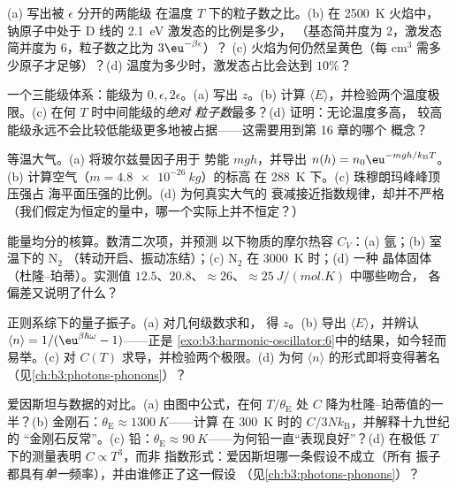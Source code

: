 \begin{exercise}[$\star$]\label{exo:b3:canonical-ensemble:1}
(a) 写出被 $\epsilon$ 分开的两能级
在温度 $T$ 下的粒子数之比。(b) 在 \qty{2500}{K} 火焰中，
钠原子中处于 D 线的 \qty{2.1}{eV} 激发态的比例是多少，
（基态简并度为 2，激发态简并度为 6，粒子数之比为
$3\eu^{-\beta\epsilon}$）？
(c) 火焰为何仍然呈黄色（每
cm$^3$ 需多少原子才足够）？(d) 温度为多少时，激发态占比会达到
$10\%$？
\end{exercise}

\begin{exercise}[$\star$]\label{exo:b3:canonical-ensemble:2}
一个三能级体系：能级为 $0, \epsilon, 2\epsilon$。(a) 写出 $z$。(b)
计算 $\langle E\rangle$，并检验两个温度极限。(c)
在何 $T$ 时中间能级的\emph{绝对
粒子数}最多？(d) 证明：无论温度多高，
较高能级永远不会比较低能级更多地被占据——这需要用到第 16 章的哪个
概念？
\end{exercise}

\begin{exercise}[$\star$]\label{exo:b3:canonical-ensemble:3}
等温大气。(a) 将玻尔兹曼因子用于
势能 $mgh$，并导出 $n(h) = n_0\eu^{-mgh/k_{\text{B}}
T}$。(b) 计算空气（$m = \qty{4.8e-26}{kg}$）的标高
在 \qty{288}{K} 下。(c) 珠穆朗玛峰峰顶压强占
海平面压强的比例。(d) 为何真实大气的
衰减接近指数规律，却并不严格（我们假定为恒定的量中，哪一个实际上并不恒定？）
\end{exercise}

\begin{exercise}[$\star$]\label{exo:b3:canonical-ensemble:4}
能量均分的核算。数清二次项，并预测
以下物质的摩尔热容 $C_V$：(a) 氩；(b) 室温下的 N$_2$
（转动开启、振动冻结）；(c) N$_2$ 在 \qty{3000}{K} 时；(d) 一种
晶体固体（杜隆–珀蒂）。实测值
$12.5$、$20.8$、$\approx26$、$\approx\qty{25}{J/(mol.K)}$ 中哪些吻合，
各偏差又说明了什么？
\end{exercise}

\begin{exercise}[$\star\star$]\label{exo:b3:canonical-ensemble:5}
正则系综下的量子振子。(a) 对几何级数求和，
得 $z$。(b) 导出 $\langle E\rangle$，并辨认 $\langle
n\rangle = 1/(\eu^{\beta\hbar\omega} - 1)$——正是
\cref{exo:b3:harmonic-oscillator:6}中的结果，如今轻而易举。(c)
对 $C(T)$ 求导，并检验两个极限。(d) 为何
$\langle n\rangle$ 的形式即将变得著名
（见\cref{ch:b3:photons-phonons}）？
\end{exercise}

\begin{exercise}[$\star\star$]\label{exo:b3:canonical-ensemble:6}
爱因斯坦与数据的对比。(a) 由图中公式，在何
$T/\theta_{\text{E}}$ 处 $C$ 降为杜隆–珀蒂值的一半？(b)
金刚石：$\theta_{\text{E}} \approx \qty{1300}{K}$——计算
在 \qty{300}{K} 时的 $C/3Nk_{\text{B}}$，并解释十九世纪的
“金刚石反常”。(c) 铅：$\theta_{\text{E}}
\approx \qty{90}{K}$——为何铅一直“表现良好”？(d)
在极低 $T$ 下的测量表明 $C \propto T^3$，而非
指数形式：爱因斯坦哪一条假设不成立（所有
振子都具有\emph{单一}频率），并由谁修正了这一假设
（见\cref{ch:b3:photons-phonons}）？
\end{exercise}

